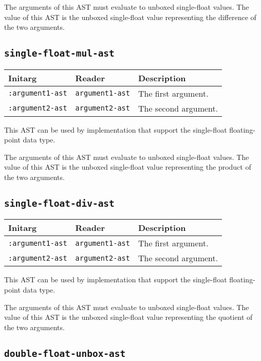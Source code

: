 The arguments of this AST must evaluate to unboxed single-float
values.  The value of this AST is the unboxed single-float value
representing the difference of the two arguments.

\subsection{\texttt{single-float-mul-ast}}
\label{sec-ast-single-float-mul}

\begin{tabular}{|l|l|l|}
\hline
Initarg & Reader & Description\\
\hline\hline
\texttt{:argument1-ast} & \texttt{argument1-ast} & The first argument.\\
\hline
\texttt{:argument2-ast} & \texttt{argument2-ast} & The second argument.\\
\hline
\end{tabular}

This AST can be used by implementation that support the single-float
floating-point data type.  

The arguments of this AST must evaluate to unboxed single-float
values.  The value of this AST is the unboxed single-float value
representing the product of the two arguments.

\subsection{\texttt{single-float-div-ast}}
\label{sec-ast-single-float-div}

\begin{tabular}{|l|l|l|}
\hline
Initarg & Reader & Description\\
\hline\hline
\texttt{:argument1-ast} & \texttt{argument1-ast} & The first argument.\\
\hline
\texttt{:argument2-ast} & \texttt{argument2-ast} & The second argument.\\
\hline
\end{tabular}

This AST can be used by implementation that support the single-float
floating-point data type.  

The arguments of this AST must evaluate to unboxed single-float
values.  The value of this AST is the unboxed single-float value
representing the quotient of the two arguments.

\subsection{\texttt{double-float-unbox-ast}}
\label{sec-ast-double-float-unbox}

